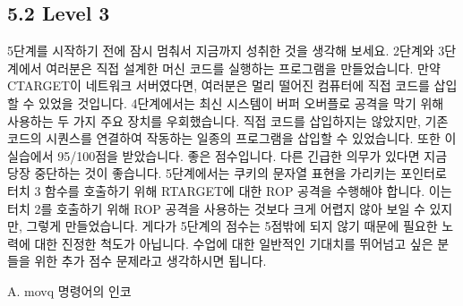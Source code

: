 \documentclass[10pt]{article}
\begin{document}
\subsection*{5.2 Level 3}
5단계를 시작하기 전에 잠시 멈춰서 지금까지 성취한 것을 생각해 보세요. 2단계와 3단계에서 여러분은 직접 설계한 머신 코드를 실행하는 프로그램을 만들었습니다. 만약 CTARGET이 네트워크 서버였다면, 여러분은 멀리 떨어진 컴퓨터에 직접 코드를 삽입할 수 있었을 것입니다. 4단계에서는 최신 시스템이 버퍼 오버플로 공격을 막기 위해 사용하는 두 가지 주요 장치를 우회했습니다. 직접 코드를 삽입하지는 않았지만, 기존 코드의 시퀀스를 연결하여 작동하는 일종의 프로그램을 삽입할 수 있었습니다. 또한 이 실습에서 95/100점을 받았습니다. 좋은 점수입니다. 다른 긴급한 의무가 있다면 지금 당장 중단하는 것이 좋습니다.
\noindent
5단계에서는 쿠키의 문자열 표현을 가리키는 포인터로 터치 3 함수를 호출하기 위해 RTARGET에 대한 ROP 공격을 수행해야 합니다. 이는 터치 2를 호출하기 위해 ROP 공격을 사용하는 것보다 크게 어렵지 않아 보일 수 있지만, 그렇게 만들었습니다. 게다가 5단계의 점수는 5점밖에 되지 않기 때문에 필요한 노력에 대한 진정한 척도가 아닙니다. 수업에 대한 일반적인 기대치를 뛰어넘고 싶은 분들을 위한 추가 점수 문제라고 생각하시면 됩니다.




















A. movq 명령어의 인코
\end{document}
